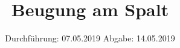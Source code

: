 

\subject{V406}
\title{Beugung am Spalt}
\date{%
Durchführung: {07.05.2019}
\hspace{3em}
Abgabe: {14.05.2019}
}



\maketitle
\thispagestyle{empty}
\tableofcontents
\newpage





\printbibliography{}

